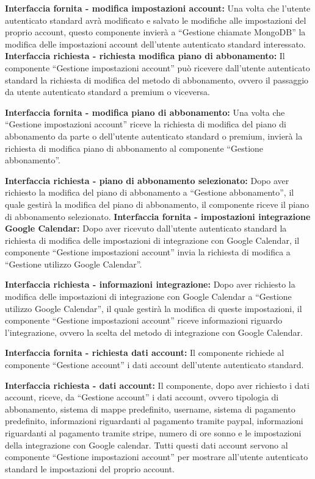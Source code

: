 \begin{listaPersonale}[DCI]{}
    \textbf{Interfaccia fornita - modifica impostazioni account:} Una volta che l'utente autenticato standard avrà modificato e salvato le modifiche alle impostazioni del proprio account, questo componente invierà a “Gestione chiamate MongoDB” la modifica delle impostazioni account dell'utente autenticato standard interessato.
    \textbf{Interfaccia richiesta - richiesta modifica piano di
        abbonamento:} Il componente “Gestione impostazioni account” può ricevere dall'utente autenticato standard la richiesta di modifica del metodo di abbonamento, ovvero il passaggio da utente autenticato standard a premium o viceversa.

    \textbf{Interfaccia fornita - modifica piano di abbonamento:} Una volta che “Gestione impostazioni account” riceve la richiesta di modifica del piano di abbonamento da parte o dell'utente autenticato standard o premium, invierà la richiesta di modifica piano di abbonamento al componente “Gestione abbonamento”.

    \textbf{Interfaccia richiesta - piano di abbonamento selezionato:} Dopo aver richiesto la modifica del piano di abbonamento a “Gestione abbonamento”, il quale gestirà la modifica del piano di abbonamento, il componente riceve il piano di abbonamento selezionato.
    \textbf{Interfaccia fornita - impostazioni integrazione Google
        Calendar:} Dopo aver ricevuto dall'utente autenticato standard la richiesta di modifica delle impostazioni di integrazione con Google Calendar, il componente “Gestione impostazioni account” invia la richiesta di modifica a “Gestione utilizzo Google Calendar”.

    \textbf{Interfaccia richiesta - informazioni integrazione:} Dopo aver richiesto la modifica delle impostazioni di integrazione con Google Calendar a “Gestione utilizzo Google Calendar”, il quale gestirà la modifica di queste impostazioni, il componente “Gestione impostazioni account” riceve informazioni riguardo l'integrazione, ovvero la scelta del metodo di integrazione con Google Calendar.

    \textbf{Interfaccia fornita - richiesta dati account:} Il componente richiede al componente “Gestione account” i dati account dell'utente autenticato standard.

    \textbf{Interfaccia richiesta - dati account:} Il componente, dopo aver richiesto i dati account, riceve, da “Gestione account” i dati account, ovvero tipologia di abbonamento, sistema di mappe predefinito, username, sistema di pagamento predefinito, informazioni riguardanti al pagamento tramite paypal, informazioni riguardanti al pagamento tramite stripe, numero di ore sonno e le impostazioni della integrazione con Google calendar. Tutti questi dati account servono al componente “Gestione impostazioni account” per mostrare all'utente autenticato standard le impostazioni del proprio account.



\end{listaPersonale}
